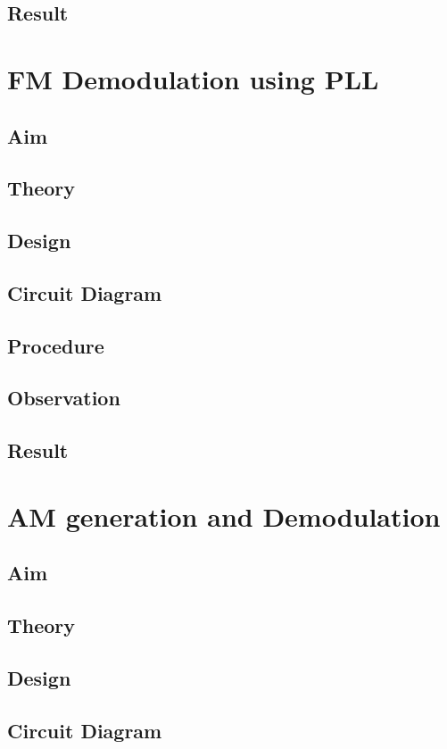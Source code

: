 \documentclass{book}
\begin{document}
\section*{Result}

\chapter[FM Demodulation using PLL]{FM Demodulation using PLL}
\section*{Aim}
\section*{Theory}
\section*{Design}
\section*{Circuit Diagram}
\section*{Procedure}
\section*{Observation}
\section*{Result}

\chapter[AM generation and Demodulation]{AM generation and Demodulation}
\section*{Aim}
\section*{Theory}
\section*{Design}
\section*{Circuit Diagram}
\end{document}
